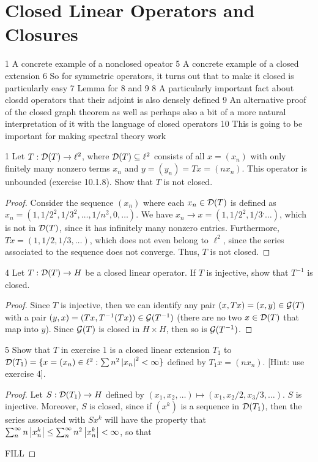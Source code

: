 \section{Closed Linear Operators and Closures}

1 A concrete example of a nonclosed opeator
5 A concrete example of a closed extension
6 So for symmetric operators, it turns out that to make it closed is particularly easy 
7 Lemma for 8 and 9
8 A particularly important fact about closdd operators that their adjoint is also densely defined
9 An alternative proof of the closed graph theorem as well as perhaps also a bit of a more natural interpretation of it with the language of closed operators
10 This is going to be important for making spectral theory work

\begin{exercise}{1}
Let $T: \mathcal{D}(T) \to \ell^2$, where $\mathcal{D}(T) \subseteq \ell^2$ consists of all $x = (x_n)$ with only finitely many nonzero terms $x_n$ and $y = (y_n) = Tx = (n x_n)$.
This operator is unbounded (exercise 10.1.8).
Show that $T$ is not closed.
\end{exercise}
\begin{proof}
Consider the sequence $(x_n)$ where each $x_n \in \mathcal{D}(T)$ is defined as $x_n = (1, 1/2^2, 1/3^2, \dots, 1/n^2, 0, \dots)$.
We have $x_n \to x = (1, 1/2^2, 1/3^, \dots)$, which is not in $\mathcal{D}(T)$, since it has infinitely many nonzero entries.
Furthermore, $Tx = (1, 1/2, 1/3, \dots)$, which does not even belong to $\ell^2$, since the series associated to the sequence does not converge.
Thus, $T$ is not closed.
\end{proof} 

\begin{exercise}{4}
Let $T: \mathcal{D}(T) \to H$ be a closed linear operator.
If $T$ is injective, show that $T^{-1}$ is closed.
\end{exercise}
\begin{proof}
Since $T$ is injective, then we can identify any pair $(x, Tx) = (x, y) \in \mathcal{G}(T)$ with a pair $(y, x) = (Tx, T^{-1}(Tx)) \in \mathcal{G}(T^{-1})$ (there are no two $x \in \mathcal{D}(T)$ that map into $y$).
Since $\mathcal{G}(T)$ is closed in $H \times H$, then so is $\mathcal{G}(T^{-1})$.
\end{proof} 

\begin{exercise}{5}
Show that $T$ in exercise 1 is a closed linear extension $T_1$ to $\mathcal{D}(T_1) = \{x = (x_n) \in \ell^2: \sum n^2 \left\lvert x_n\right\rvert^2 < \infty\}$ defined by $T_1 x = (n x_n)$.
[Hint: use exercise 4].
\end{exercise}
\begin{proof}
Let $S: \mathcal{D}(T_1) \to H$ defined by $(x_1, x_2, \dots) \mapsto (x_1, x_2/2, x_3/3, \dots)$.
$S$ is injective.
Moreover, $S$ is closed, since if $(x^k)$ is a sequence in $\mathcal{D}(T_1)$, then the series associated with $S x^k$ will have the property that $\sum_n^\infty n \left\lvert x_n^k\right\rvert \leq \sum_n^\infty n^2 \left\lvert x_n^k\right\rvert < \infty$, so that 


FILL
\end{proof} 

